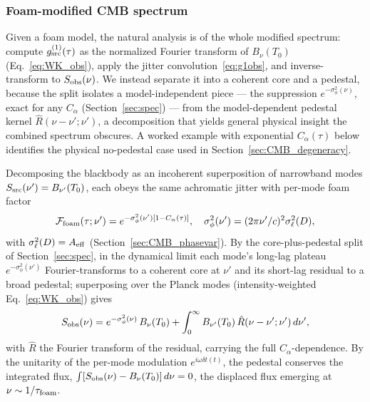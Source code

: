 \documentclass[aps,prd,onecolumn,amsmath,amssymb]{revtex4-2}
\begin{document}
\subsubsection{Foam-modified CMB spectrum}
\label{sec:CMB_derivation}

Given a foam model, the natural analysis is of the whole modified
spectrum: compute $g^{(1)}_{\rm src}(\tau)$ as the normalized
Fourier transform of
$B_\nu(T_0)$ (Eq.~\eqref{eq:WK_obs}), apply the jitter
convolution~\eqref{eq:g1obs}, and inverse-transform to $S_{\rm obs}(\nu)$.
We instead separate it into a coherent core and a pedestal, because the
split isolates a model-independent piece --- the suppression
$e^{-\sigma_\phi^2(\nu)}$, exact for any $C_\alpha$
(Section~\ref{sec:spec}) --- from the model-dependent pedestal
kernel $\hat{R}(\nu-\nu';\nu')$, a decomposition that yields general
physical insight the combined spectrum obscures.  A worked example with
exponential $C_\alpha(\tau)$ below identifies the physical no-pedestal
case used in Section~\ref{sec:CMB_degeneracy}.

Decomposing the blackbody as an incoherent superposition of narrowband
modes $S_{\rm src}(\nu')=B_{\nu'}(T_0)$, each obeys the
same achromatic jitter with per-mode foam factor
\begin{equation}
  \mathcal{F}_{\rm foam}(\tau;\nu')
    = e^{-\sigma_\phi^2(\nu')[1-C_\alpha(\tau)]},
  \quad
  \sigma_\phi^2(\nu')=(2\pi\nu'/c)^2\sigma_\ell^2(D),
  \label{eq:Ffoam_CMB}
\end{equation}
with $\sigma_\ell^2(D)=A_{\rm eff}$ (Section~\ref{sec:CMB_phasevar}).  By
the core-plus-pedestal split of Section~\ref{sec:spec}, in the dynamical
limit each mode's long-lag plateau $e^{-\sigma_\phi^2(\nu')}$
Fourier-transforms to a coherent core at $\nu'$ and its short-lag
residual to a broad pedestal; superposing over the Planck modes
(intensity-weighted Eq.~\eqref{eq:WK_obs}) gives
\begin{equation}
  S_{\rm obs}(\nu)
    = e^{-\sigma_\phi^2(\nu)}\,B_\nu(T_0)
    + \int_0^\infty B_{\nu'}(T_0)\,\hat{R}(\nu-\nu';\nu')\,d\nu',
  \label{eq:CMB_spectrum}
\end{equation}
with $\hat{R}$ the Fourier transform of the residual, carrying the full
$C_\alpha$-dependence.  By the unitarity of the per-mode modulation
$e^{i\omega\delta t(t)}$, the pedestal conserves the integrated
flux, $\int[S_{\rm obs}(\nu)-B_\nu(T_0)]\,d\nu=0$, the displaced flux
emerging at $\nu\sim1/\tau_{\rm foam}$.
\end{document}
